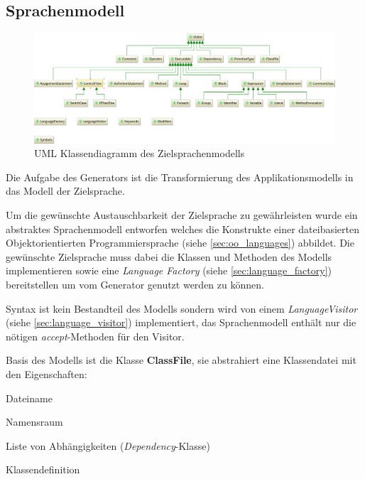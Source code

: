 \subsection{Sprachenmodell}
\label{sec:language_model}

\begin{figure}
    \centering
    \includegraphics[width=\textwidth]{resources/languagemodel_common}
    \caption{UML Klassendiagramm des Zielsprachenmodells}
    \label{fig:language_model}
\end{figure}

Die Aufgabe des Generators ist die Transformierung des Applikationsmodells in das Modell der Zielsprache. 

Um die gewünschte Austauschbarkeit der Zielsprache zu gewährleisten wurde ein abstraktes Sprachenmodell entworfen welches die Konstrukte einer dateibasierten Objektorientierten Programmiersprache (siehe \cref{sec:oo_languages}) abbildet. 
Die gewünschte Zielsprache muss dabei die Klassen und Methoden des Modells implementieren sowie eine \emph{Language Factory} (siehe \cref{sec:language_factory}) bereitstellen um vom Generator genutzt werden zu können.

Syntax ist kein Bestandteil des Modells sondern wird von einem \emph{LanguageVisitor} (siehe \cref{sec:language_visitor}) implementiert, das Sprachenmodell enthält nur die nötigen \emph{accept}-Methoden für den Visitor.

Basis des Modells ist die Klasse \textbf{ClassFile}, sie abstrahiert eine Klassendatei mit den Eigenschaften:
\begin{compactitem}
    \item Dateiname
    \item Namensraum
    \item Liste von Abhängigkeiten (\emph{Dependency}-Klasse)
    \item Klassendefinition
\end{compactitem}

